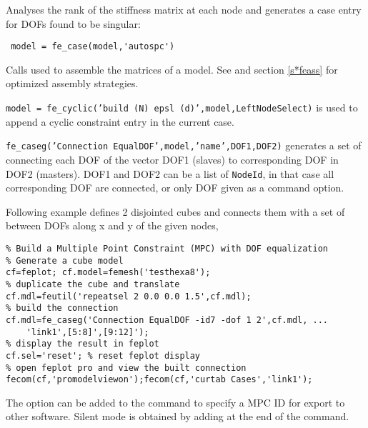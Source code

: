 \begin{SDT}

Analyses the rank of the stiffness matrix at each node and generates a  case entry for DOFs found to be singular: 
\begin{verbatim}
 model = fe_case(model,'autospc')
\end{verbatim}

Calls used to assemble the matrices of a model. See  and section \ref{s*feass} for optimized assembly strategies.\\


{\tt model = fe\_cyclic('build (N) epsl (d)',model,LeftNodeSelect)} is used to append a cyclic constraint entry in the current case.


{\tt fe\_caseg('Connection EqualDOF',model,'name',{\ti DOF1},{\ti DOF2})} generates a set of  connecting each DOF of the vector {\ti DOF1} (slaves) to corresponding DOF in {\ti DOF2} (masters). {\ti DOF1} and {\ti DOF2} can be a list of {\tt NodeId}, in that case all corresponding DOF are connected, or only DOF given as a  command option.

Following example defines 2 disjointed cubes and connects them with a set of  between DOFs along x and y of the given nodes,
\begin{verbatim}
% Build a Multiple Point Constraint (MPC) with DOF equalization
% Generate a cube model
cf=feplot; cf.model=femesh('testhexa8');
% duplicate the cube and translate
cf.mdl=feutil('repeatsel 2 0.0 0.0 1.5',cf.mdl);
% build the connection
cf.mdl=fe_caseg('Connection EqualDOF -id7 -dof 1 2',cf.mdl, ...
    'link1',[5:8]',[9:12]');
% display the result in feplot
cf.sel='reset'; % reset feplot display
% open feplot pro and view the built connection
fecom(cf,'promodelviewon');fecom(cf,'curtab Cases','link1');
\end{verbatim}%

The option  can be added to the command to specify a MPC ID {\ti {}} for export to other software. Silent mode is obtained by adding \ts{;} at the end of the command.


\end{SDT}
